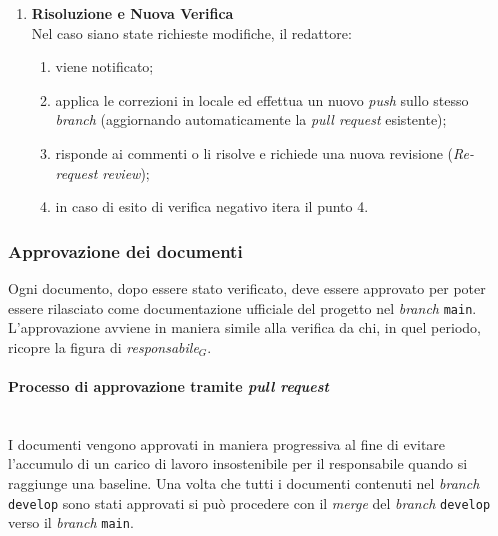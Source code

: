 \documentclass[10pt, letterpaper]{article}
\newcommand{\trisubsection}[1]{\paragraph{#1}\mbox{}\\}
\begin{document}
\begin{enumerate}
    \item \textbf{Risoluzione e Nuova Verifica}\\
          Nel caso siano state richieste modifiche, il redattore:
          \begin{enumerate}
              \item viene notificato;
              \item applica le correzioni in locale ed effettua un nuovo \textit{push} sullo stesso \textit{branch}
                    (aggiornando automaticamente la \textit{pull request} esistente);
              \item risponde ai commenti o li risolve e richiede una nuova revisione (\textit{Re-request review});
              \item in caso di esito di verifica negativo itera il punto 4.
          \end{enumerate}
\end{enumerate}

\subsubsection{Approvazione dei documenti}
Ogni documento, dopo essere stato verificato, deve essere approvato per poter essere rilasciato come documentazione ufficiale del progetto
nel \textit{branch} \texttt{main}. L'approvazione avviene in maniera simile alla verifica da chi, in quel periodo, ricopre la figura di \textit{responsabile$_{G}$}.

\trisubsection{Processo di approvazione tramite \textit{pull request}}
I documenti vengono approvati in maniera progressiva al fine di evitare l'accumulo di un carico di lavoro insostenibile per il responsabile
quando si raggiunge una baseline. Una volta che tutti i documenti contenuti nel \textit{branch} \texttt{develop} sono stati approvati si può procedere
con il \textit{merge} del \textit{branch} \texttt{develop} verso il \textit{branch} \texttt{main}.
\end{document}
